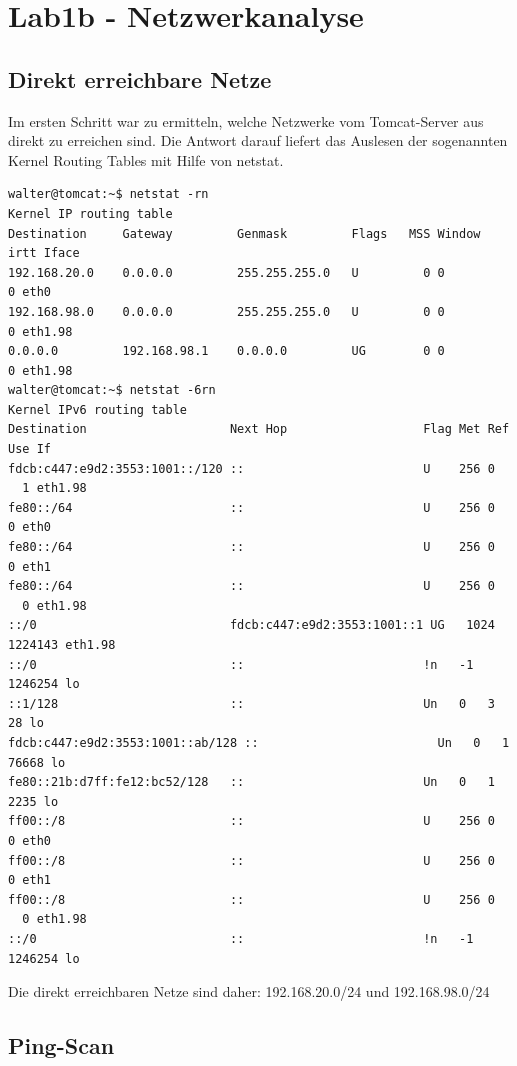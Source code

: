 \section{Lab1b - Netzwerkanalyse}

\subsection{Direkt erreichbare Netze}

Im ersten Schritt war zu ermitteln, welche Netzwerke vom Tomcat-Server aus direkt zu erreichen sind. Die Antwort darauf liefert das Auslesen der sogenannten Kernel Routing Tables mit Hilfe von netstat.

\begin{lstlisting}
walter@tomcat:~$ netstat -rn
Kernel IP routing table
Destination     Gateway         Genmask         Flags   MSS Window  irtt Iface
192.168.20.0    0.0.0.0         255.255.255.0   U         0 0          0 eth0
192.168.98.0    0.0.0.0         255.255.255.0   U         0 0          0 eth1.98
0.0.0.0         192.168.98.1    0.0.0.0         UG        0 0          0 eth1.98
walter@tomcat:~$ netstat -6rn
Kernel IPv6 routing table
Destination                    Next Hop                   Flag Met Ref Use If
fdcb:c447:e9d2:3553:1001::/120 ::                         U    256 0
  1 eth1.98
fe80::/64                      ::                         U    256 0     0 eth0
fe80::/64                      ::                         U    256 0     0 eth1
fe80::/64                      ::                         U    256 0
  0 eth1.98
::/0                           fdcb:c447:e9d2:3553:1001::1 UG   1024
1224143 eth1.98
::/0                           ::                         !n   -1  1246254 lo
::1/128                        ::                         Un   0   3    28 lo
fdcb:c447:e9d2:3553:1001::ab/128 ::                         Un   0   1 76668 lo
fe80::21b:d7ff:fe12:bc52/128   ::                         Un   0   1  2235 lo
ff00::/8                       ::                         U    256 0     0 eth0
ff00::/8                       ::                         U    256 0     0 eth1
ff00::/8                       ::                         U    256 0
  0 eth1.98
::/0                           ::                         !n   -1  1246254 lo
\end{lstlisting}

Die direkt erreichbaren Netze sind daher: 192.168.20.0/24 und 192.168.98.0/24

\subsection{Ping-Scan}


